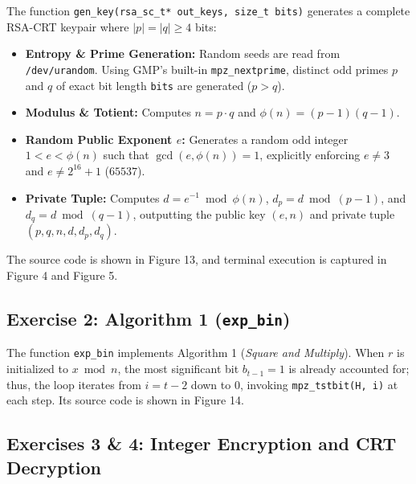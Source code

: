 \documentclass[10pt,twocolumn,letterpaper]{article}
\begin{document}
The function \texttt{gen\_key(rsa\_sc\_t* out\_keys, size\_t bits)} generates a complete RSA-CRT keypair where $|p| = |q| \ge 4$ bits:
\begin{itemize}
    \item \textbf{Entropy \& Prime Generation:} Random seeds are read from \texttt{/dev/urandom}. Using GMP's built-in \texttt{mpz\_nextprime}, distinct odd primes $p$ and $q$ of exact bit length \texttt{bits} are generated ($p > q$).
    \item \textbf{Modulus \& Totient:} Computes $n = p \cdot q$ and $\phi(n) = (p-1)(q-1)$.
    \item \textbf{Random Public Exponent $e$:} Generates a random odd integer $1 < e < \phi(n)$ such that $\gcd(e, \phi(n)) = 1$, explicitly enforcing $e \neq 3$ and $e \neq 2^{16}+1$ ($65537$).
    \item \textbf{Private Tuple:} Computes $d = e^{-1} \bmod \phi(n)$, $d_p = d \bmod (p-1)$, and $d_q = d \bmod (q-1)$, outputting the public key $(e, n)$ and private tuple $(p, q, n, d, d_p, d_q)$.
\end{itemize}
The source code is shown in Figure 13, and terminal execution is captured in Figure 4 and Figure 5.

\subsection{Exercise 2: Algorithm 1 (\texttt{exp\_bin})}

The function \texttt{exp\_bin} implements Algorithm 1 (\textit{Square and Multiply}). When $r$ is initialized to $x \bmod n$, the most significant bit $b_{t-1}=1$ is already accounted for; thus, the loop iterates from $i = t - 2$ down to $0$, invoking \texttt{mpz\_tstbit(H, i)} at each step. Its source code is shown in Figure 14.

\subsection{Exercises 3 \& 4: Integer Encryption and CRT Decryption}
\end{document}
